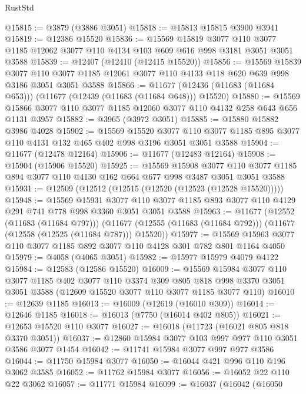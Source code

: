 \begin{lexlean}{RustStd}
\begin{coremodule}
@15815 := @3879 (@3886 @3051)
@15818 := @15813 @15815 @3900 @3941
@15819 := @12386 @15520
@15836 := @15569
    @15819
    @3077
    @110
    @3077
    @1185
    @12062
    @3077
    @110
    @4134
    @103
    @609
    @616
    @998
    @3181
    @3051
    @3051
    @3588
@15839 := @12407 (@12410 (@12415 @15520))
@15856 := @15569
    @15839
    @3077
    @110
    @3077
    @1185
    @12061
    @3077
    @110
    @4133
    @118
    @620
    @639
    @998
    @3186
    @3051
    @3051
    @3588
@15866 := @11677 (@12436 (@11683 (@11684 @653))) (@11677 (@12439 (@11683 (@11684 @648))) @15520)
@15880 := @15569 @15866 @3077 @110 @3077 @1185 @12060 @3077 @110 @4132 @258 @643 @656 @1131 @3957
@15882 := @3965 (@3972 @3051)
@15885 := @15880 @15882 @3986 @4028
@15902 := @15569
    @15520
    @3077
    @110
    @3077
    @1185
    @895
    @3077
    @110
    @4131
    @132
    @465
    @402
    @998
    @3196
    @3051
    @3051
    @3588
@15904 := @11677 (@12478 @12164)
@15906 := @11677 (@12483 @12164)
@15908 := @15904 (@15906 @15520)
@15925 := @15569
    @15908
    @3077
    @110
    @3077
    @1185
    @894
    @3077
    @110
    @4130
    @162
    @664
    @677
    @998
    @3487
    @3051
    @3051
    @3588
@15931 := @12509 (@12512 (@12515 (@12520 (@12523 (@12528 @15520)))))
@15948 := @15569
    @15931
    @3077
    @110
    @3077
    @1185
    @893
    @3077
    @110
    @4129
    @291
    @741
    @778
    @998
    @3360
    @3051
    @3051
    @3588
@15963 := @11677
    (@12552 (@11683 (@11684 @797)))
    (@11677 (@12555 (@11683 (@11684 @792))) (@11677 (@12558 (@12525 (@11684 @787))) @15520))
@15977 := @15569 @15963 @3077 @110 @3077 @1185 @892 @3077 @110 @4128 @301 @782 @801 @1164 @4050
@15979 := @4058 (@4065 @3051)
@15982 := @15977 @15979 @4079 @4122
@15984 := @12583 (@12586 @15520)
@16009 := @15569
    @15984
    @3077
    @110
    @3077
    @1185
    @402
    @3077
    @110
    @3374
    @309
    @805
    @818
    @998
    @3370
    @3051
    @3051
    @3588
    (@12609 @15520 @3077 @110 @3077 @1185 @3077 @110)
@16010 := @12639 @1185
@16013 := @16009 (@12619 (@16010 @309))
@16014 := @12646 @1185
@16018 := @16013 (@7750 (@16014 @402 @805))
@16021 := @12653 @15520 @110 @3077
@16027 := @16018 (@11723 (@16021 @805 @818 @3370 @3051))
@16037 := @12860 @15984 @3077 @103 @997 @977 @110 @3051 @3586 @3077 @1454
@16042 := @11741 @15984 @3077 @997 @977 @3586
@16044 := @11750 @15984 @3077
@16050 := @16044 @421 @996 @110 @196 @3062 @3585
@16052 := @11762 @15984 @3077
@16056 := @16052 @22 @110 @22 @3062
@16057 := @11771 @15984
@16099 := @16037
    (@16042
      (@16050

\end{coremodule}
\end{lexlean}
